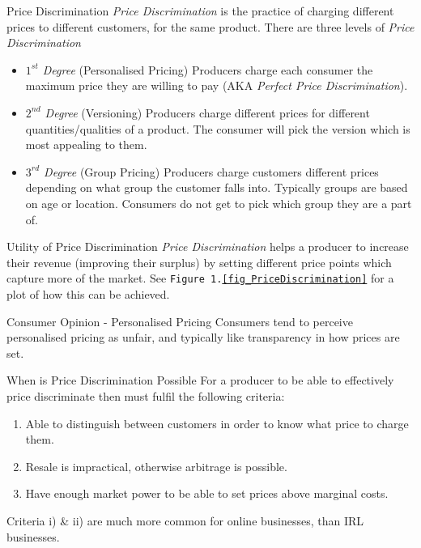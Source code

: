\documentclass[11pt,a4paper]{article}
\begin{document}
  \begin{definition}{Price Discrimination}
    \textit{Price Discrimination} is the practice of charging different prices to different customers, for the same product. There are three levels of \textit{Price Discrimination}
    \begin{itemize}
      \item \textit{$1^{st}$ Degree} (Personalised Pricing) Producers charge each consumer the maximum price they are willing to pay (AKA \textit{Perfect Price Discrimination}).
      \item \textit{$2^{nd}$ Degree} (Versioning) Producers charge different prices for different quantities/qualities of a product. The consumer will pick the version which is most appealing to them.
      \item \textit{$3^{rd}$ Degree} (Group Pricing) Producers charge customers different prices depending on what group the customer falls into. Typically groups are based on age or location. Consumers do not get to pick which group they are a part of.
    \end{itemize}
  \end{definition}

  \begin{remark}{Utility of Price Discrimination}
    \textit{Price Discrimination} helps a producer to increase their revenue (improving their surplus) by setting different price points which capture more of the market. See \texttt{Figure 1.\ref{fig_PriceDiscrimination}} for a plot of how this can be achieved.
  \end{remark}

  \begin{remark}{Consumer Opinion - Personalised Pricing}
    Consumers tend to perceive personalised pricing as unfair, and typically like transparency in how prices are set.
  \end{remark}

  \begin{proposition}{When is Price Discrimination Possible}
    For a producer to be able to effectively price discriminate then must fulfil the following criteria:
    \begin{enumerate}
      \item Able to distinguish between customers in order to know what price to charge them.
      \item Resale is impractical, otherwise arbitrage is possible.
      \item Have enough market power to be able to set prices above marginal costs.
    \end{enumerate}
    Criteria i) \& ii) are much more common for online businesses, than IRL businesses.
  \end{proposition}
\end{document}
